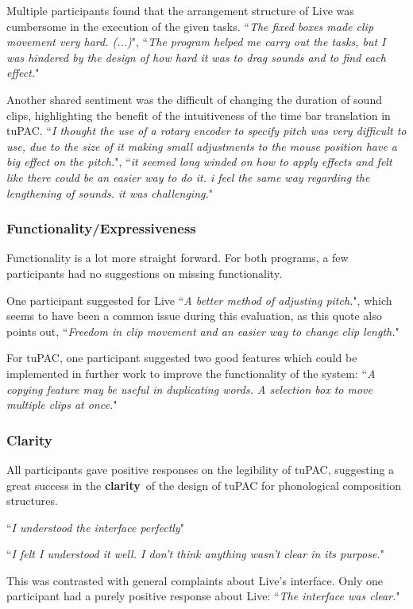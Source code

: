 \documentclass[12pt,a4paper,oneside,openright]{report}
\newcommand{\clarity}{\textbf{clarity}}
\newcommand{\quoteT}[1]{``\textit{#1}"}
\begin{document}
Multiple participants found that the arrangement structure of Live was cumbersome in the execution of the given tasks. \quoteT{The fixed boxes made clip movement very hard. (...)}, \quoteT{The program helped me carry out the tasks, but I was hindered by the design of how hard it was to drag sounds and to find each effect.}

Another shared sentiment was the difficult of changing the duration of sound clips, highlighting the benefit of the intuitiveness of the time bar translation in tuPAC. \quoteT{I thought the use of a rotary encoder to specify pitch was very difficult to use, due to the size of it making small adjustments to the mouse position have a big effect on the pitch.}, \quoteT{it seemed long winded on how to apply effects and felt like there could be an easier way to do it. i feel the same way regarding the lengthening of sounds. it was challenging.}

\subsubsection{Functionality/Expressiveness}\label{sec:qual_funct}
Functionality is a lot more straight forward. For both programs, a few participants had no suggestions on missing functionality.

One participant suggested for Live \quoteT{A better method of adjusting pitch.}, which seems to have been a common issue during this evaluation, as this quote also points out, \quoteT{Freedom in clip movement and an easier way to change clip length.}

For tuPAC, one participant suggested two good features which could be implemented in further work to improve the functionality of the system: \quoteT{A copying feature may be useful in duplicating words. A selection box to move multiple clips at once.}

\subsubsection{Clarity}
All participants gave positive responses on the legibility of tuPAC, suggesting a great success in the \clarity\ of the design of tuPAC for phonological composition structures.


\quoteT{I understood the interface perfectly}

\quoteT{I felt I understood it well. I don’t think anything wasn’t clear in its purpose.}

This was contrasted with general complaints about Live's interface. Only one participant had a purely positive response about Live: \quoteT{The interface was clear.}
\end{document}
